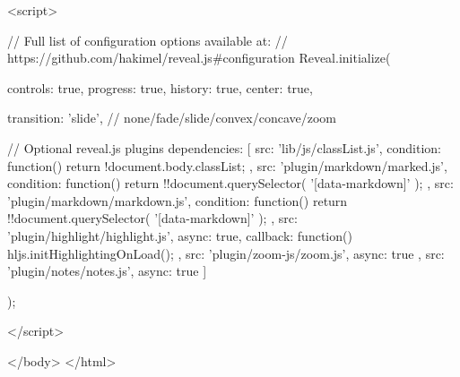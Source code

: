 		<script>

			// Full list of configuration options available at:
			// https://github.com/hakimel/reveal.js#configuration
			Reveal.initialize({
				controls: true,
				progress: true,
				history: true,
				center: true,

				transition: 'slide', // none/fade/slide/convex/concave/zoom

				// Optional reveal.js plugins
				dependencies: [
					{ src: 'lib/js/classList.js', condition: function() { return !document.body.classList; } },
					{ src: 'plugin/markdown/marked.js', condition: function() { return !!document.querySelector( '[data-markdown]' ); } },
					{ src: 'plugin/markdown/markdown.js', condition: function() { return !!document.querySelector( '[data-markdown]' ); } },
					{ src: 'plugin/highlight/highlight.js', async: true, callback: function() { hljs.initHighlightingOnLoad(); } },
					{ src: 'plugin/zoom-js/zoom.js', async: true },
					{ src: 'plugin/notes/notes.js', async: true }
				]
			});

		</script>

	</body>
</html>
